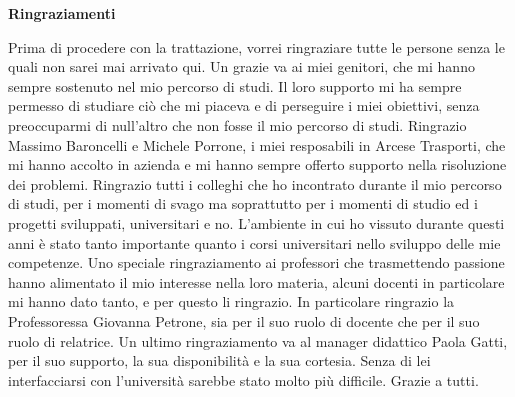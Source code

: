 \thispagestyle{plain}

\vspace*{\fill}
\centerline{\textbf{Ringraziamenti}}
Prima di procedere con la trattazione, vorrei ringraziare tutte le persone senza le quali non sarei mai arrivato qui.
Un grazie va ai miei genitori, che mi hanno sempre sostenuto nel mio percorso di studi. 
Il loro supporto mi ha sempre permesso di studiare ciò che mi piaceva e di perseguire i miei obiettivi, senza preoccuparmi di null'altro che non fosse il mio percorso di studi.
Ringrazio Massimo Baroncelli e Michele Porrone, i miei resposabili in Arcese Trasporti, che mi hanno accolto in azienda e mi hanno sempre offerto supporto nella risoluzione dei problemi.
Ringrazio tutti i colleghi che ho incontrato durante il mio percorso di studi, per i momenti di svago ma soprattutto per i momenti di studio ed i progetti sviluppati, universitari e no.
L'ambiente in cui ho vissuto durante questi anni è stato tanto importante quanto i corsi universitari nello sviluppo delle mie competenze.
Uno speciale ringraziamento ai professori che trasmettendo passione hanno alimentato il mio interesse nella loro materia, alcuni docenti in particolare mi hanno dato tanto, e per questo li ringrazio.
In particolare ringrazio la Professoressa Giovanna Petrone, sia per il suo ruolo di docente che per il suo ruolo di relatrice. 
Un ultimo ringraziamento va al manager didattico Paola Gatti, per il suo supporto, la sua disponibilità e la sua cortesia. Senza di lei interfacciarsi con l'università sarebbe stato molto più difficile. 
Grazie a tutti.
\vspace*{\fill}